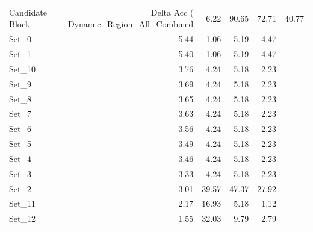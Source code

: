 \begin{tabular}{lrrrr}
\toprule
Candidate Block & Delta Acc (%
\midrule
Dynamic_Region_All_Combined & 6.22 & 90.65 & 72.71 & 40.77 \\
Set_0 & 5.44 & 1.06 & 5.19 & 4.47 \\
Set_1 & 5.40 & 1.06 & 5.19 & 4.47 \\
Set_10 & 3.76 & 4.24 & 5.18 & 2.23 \\
Set_9 & 3.69 & 4.24 & 5.18 & 2.23 \\
Set_8 & 3.65 & 4.24 & 5.18 & 2.23 \\
Set_7 & 3.63 & 4.24 & 5.18 & 2.23 \\
Set_6 & 3.56 & 4.24 & 5.18 & 2.23 \\
Set_5 & 3.49 & 4.24 & 5.18 & 2.23 \\
Set_4 & 3.46 & 4.24 & 5.18 & 2.23 \\
Set_3 & 3.33 & 4.24 & 5.18 & 2.23 \\
Set_2 & 3.01 & 39.57 & 47.37 & 27.92 \\
Set_11 & 2.17 & 16.93 & 5.18 & 1.12 \\
Set_12 & 1.55 & 32.03 & 9.79 & 2.79 \\
\bottomrule
\end{tabular}
